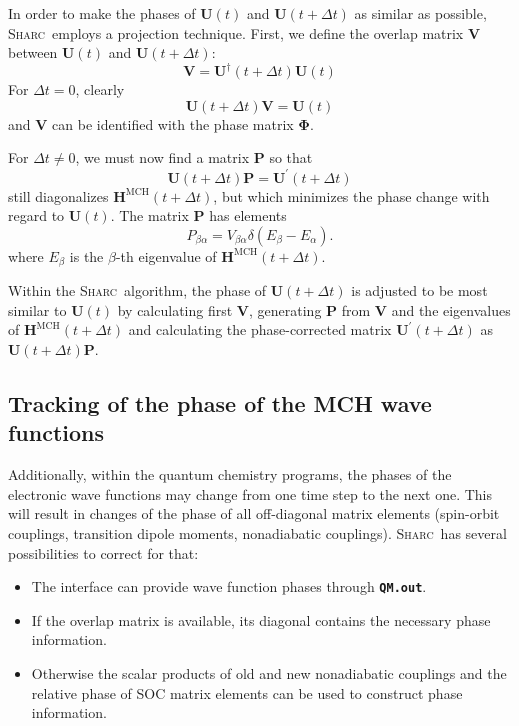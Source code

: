 \documentclass[a4paper,10pt,DIV=15,openany,twoside=false]{scrbook}
\newcommand{\sharc}{\textsc{Sharc}}
\newcommand{\ttt}[1]{\textbf{\texttt{#1}}}
\newcommand{\VEC}[1]{\ensuremath{\mathbf{#1}}}
\begin{document}
In order to make the phases of $\VEC{U}(t)$ and $\VEC{U}(t+\Delta t)$ as similar as possible, \sharc\ employs a projection technique. First, we define the overlap matrix $\VEC{V}$ between $\VEC{U}(t)$ and $\VEC{U}(t+\Delta t)$:
\begin{equation}
  \VEC{V}=\VEC{U}^\dagger(t+\Delta t)\VEC{U}(t)
\end{equation}
For $\Delta t=0$, clearly
\begin{equation}
  \VEC{U}(t+\Delta t)\VEC{V}=\VEC{U}(t)
\end{equation}
and $\VEC{V}$ can be identified with the phase matrix $\boldsymbol{\Phi}$.

For $\Delta t\neq 0$, we must now find a matrix $\VEC{P}$ so that
\begin{equation}
  \VEC{U}(t+\Delta t)\VEC{P}=\VEC{U}^\prime(t+\Delta t)
\end{equation}
still diagonalizes $\VEC{H}^{\text{MCH}}(t+\Delta t)$, but which minimizes the phase change with regard to $\VEC{U}(t)$.
The matrix $\VEC{P}$ has elements
\begin{equation}
  P_{\beta\alpha}=V_{\beta\alpha}
  \delta\left(
    E_\beta-E_\alpha
  \right).
\end{equation}
where $E_\beta$ is the $\beta$-th eigenvalue of $\VEC{H}^{\text{MCH}}(t+\Delta t)$.

Within the \sharc\ algorithm, the phase of $\VEC{U}(t+\Delta t)$ is adjusted to be most similar to $\VEC{U}(t)$ by calculating first $\VEC{V}$, generating $\VEC{P}$ from $\VEC{V}$ and the eigenvalues of $\VEC{H}^{\text{MCH}}(t+\Delta t)$ and calculating the phase-corrected matrix $\VEC{U}^\prime(t+\Delta t)$ as $\VEC{U}(t+\Delta t)\VEC{P}$.

\subsection{Tracking of the phase of the MCH wave functions}

Additionally, within the quantum chemistry programs, the phases of the electronic wave functions may change from one time step to the next one. This will result in changes of the phase of all off-diagonal matrix elements (spin-orbit couplings, transition dipole moments, nonadiabatic couplings). \sharc\ has several possibilities to correct for that:
\begin{itemize}
  \item The interface can provide wave function phases through \ttt{QM.out}.
  \item If the overlap matrix is available, its diagonal contains the necessary phase information.
  \item Otherwise the scalar products of old and new nonadiabatic couplings and the relative phase of SOC matrix elements can be used to construct phase information.
\end{itemize}
\end{document}
